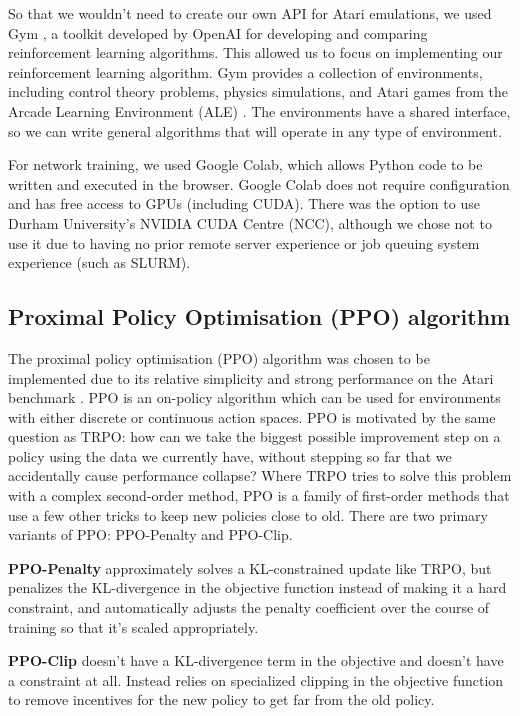 \documentclass[12pt,a4paper]{article}
\begin{document}
So that we wouldn't need to create our own API for Atari emulations, we used Gym \cite{1606.01540}, a toolkit developed by OpenAI for developing and comparing reinforcement learning algorithms. This allowed us to focus on implementing our reinforcement learning algorithm. Gym provides a collection of environments, including control theory problems, physics simulations, and Atari games from the Arcade Learning Environment (ALE) \cite{bellemare13arcade}. The environments have a shared interface, so we can write general algorithms that will operate in any type of environment.

For network training, we used Google Colab, which allows Python code to be written and executed in the browser. Google Colab does not require configuration and has free access to GPUs (including CUDA). There was the option to use Durham University's NVIDIA CUDA Centre (NCC), although we chose not to use it due to having no prior remote server experience or job queuing system experience (such as SLURM).

\subsection{Proximal Policy Optimisation (PPO) algorithm}
The proximal policy optimisation (PPO) algorithm was chosen to be implemented due to its relative simplicity and strong performance on the Atari benchmark \cite{DBLP:journals/corr/SchulmanWDRK17}. PPO is an on-policy algorithm which can be used for environments with either discrete or continuous action spaces. PPO is motivated by the same question as TRPO: how can we take the biggest possible improvement step on a policy using the data we currently have, without stepping so far that we accidentally cause performance collapse? Where TRPO tries to solve this problem with a complex second-order method, PPO is a family of first-order methods that use a few other tricks to keep new policies close to old. There are two primary variants of PPO: PPO-Penalty and PPO-Clip.

\textbf{PPO-Penalty} approximately solves a KL-constrained update like TRPO, but penalizes the KL-divergence in the objective function instead of making it a hard constraint, and automatically adjusts the penalty coefficient over the course of training so that it’s scaled appropriately.

\textbf{PPO-Clip} doesn’t have a KL-divergence term in the objective and doesn’t have a constraint at all. Instead relies on specialized clipping in the objective function to remove incentives for the new policy to get far from the old policy.
\end{document}
